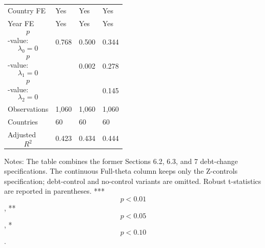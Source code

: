 \begin{table}[H]
\begin{threeparttable}
\begin{tabularx}{\textwidth}{lYYY}
Country FE & Yes & Yes & Yes \\
Year FE & Yes & Yes & Yes \\
$$p$$-value: $$\lambda_0=0$$ & 0.768 & 0.500 & 0.344 \\
$$p$$-value: $$\lambda_1=0$$ &  & 0.002 & 0.278 \\
$$p$$-value: $$\lambda_2=0$$ &  &  & 0.145 \\
Observations & 1,060 & 1,060 & 1,060 \\
Countries & 60 & 60 & 60 \\
Adjusted $$R^2$$ & 0.423 & 0.434 & 0.444 \\
\bottomrule
\end{tabularx}
\begin{tablenotes}[flushleft]\footnotesize
\item Notes: The table combines the former Sections 6.2, 6.3, and 7 debt-change specifications. The continuous Full-theta column keeps only the Z-controls specification; debt-control and no-control variants are omitted. Robust t-statistics are reported in parentheses. *** $$p<0.01$$, ** $$p<0.05$$, * $$p<0.10$$.
\end{tablenotes}
\end{threeparttable}
\end{table}
